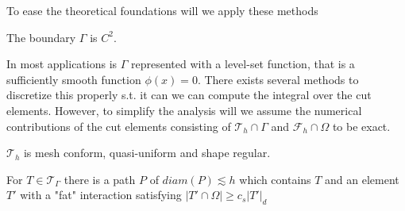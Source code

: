 To ease the theoretical foundations will we apply these methods

\begin{assumption}[G1]
    \label{as:G1}
    The boundary $\Gamma $ is $C^{2}$.
\end{assumption}

\begin{remark}
In most applications is $\Gamma $ represented with a level-set function, that is a sufficiently smooth function $\phi ( x)  = 0$. There exists several methods to discretize this properly s.t. it can we can compute the integral over the cut elements.
    However, to simplify the analysis will we assume the numerical contributions of the cut elements consisting of $\mathcal{T}_{h} \cap \Gamma   $ and $\mathcal{F}_{h} \cap \Omega  $ to be exact.
\end{remark}


\begin{assumption}[G1]
    $\mathcal{T}_{h} $ is mesh conform, quasi-uniform and shape regular.
\end{assumption}

\begin{assumption}[G3]
    For $T \in \mathcal{T} _{\Gamma   }$ there is a path $P$ of $diam(P) \lesssim h$ which contains $T$ and an element $T'$ with a "fat" interaction satisfying $\left\lvert T' \cap \Omega  \right\rvert \ge c_{s} \left\lvert T'  \right\rvert _{d}$
\end{assumption}



